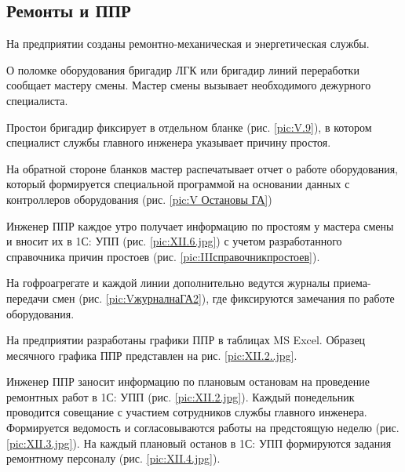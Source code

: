


\newpage
\subsection{Ремонты и ППР}
\label{bp:maintance}


На предприятии созданы ремонтно-механическая и энергетическая службы. 


О поломке оборудования бригадир ЛГК или бригадир линий переработки сообщает мастеру смены. Мастер смены вызывает необходимого дежурного специалиста. 

Простои бригадир фиксирует в отдельном бланке (рис. \ref{pic:V.9}), в котором специалист службы главного инженера указывает причину простоя. 

На обратной стороне бланков мастер распечатывает отчет о работе оборудования, который формируется специальной программой на основании данных с контроллеров оборудования (рис. \ref{pic:V Остановы ГА})  

Инженер ППР каждое утро получает информацию по простоям у мастера смены и вносит их в 1С: УПП (рис. \ref{pic:XII.6.jpg}) с учетом разработанного справочника причин простоев (рис. \ref{pic:IIIсправочникпростоев}).  

На гофроагрегате и каждой линии дополнительно ведутся журналы приема- передачи смен (рис. \ref{pic:VжурналнаГА2}), где фиксируются замечания по работе оборудования. 


На предприятии разработаны графики ППР в таблицах  MS Excel. Образец месячного графика ППР представлен на рис. \ref{pic:XII.2..jpg}.

Инженер ППР заносит информацию по плановым остановам на проведение ремонтных работ в 1С: УПП (рис. \ref{pic:XII.2.jpg}). Каждый понедельник проводится совещание с участием сотрудников службы главного инженера. Формируется ведомость и согласовываются работы на предстоящую неделю (рис. \ref{pic:XII.3.jpg}). На каждый плановый останов в 1С: УПП формируются задания ремонтному персоналу (рис. \ref{pic:XII.4.jpg}).   

